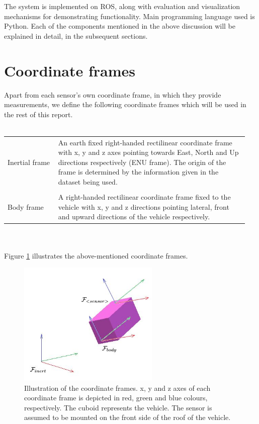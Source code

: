 The system is implemented on \gls{ROS}, along with evaluation and visualization mechanisms for demonstrating functionality. Main programming language used is Python. Each of the components mentioned in the above discussion will be explained in detail, in the subsequent sections.







\section{Coordinate frames}
Apart from each sensor's own coordinate frame, in which they provide measurements, we define the following coordinate frames which will be used in the rest of this report.\\\\
\begin{tabular}{p{0.2\linewidth} p{0.75\linewidth} } 
	Inertial frame & An earth fixed right-handed rectilinear coordinate frame with x, y and z axes pointing towards East, North and Up directions respectively (ENU frame). The origin of the frame is determined by the information given in the dataset being used.\\\\
	Body frame & A right-handed rectilinear coordinate frame fixed to the vehicle with x, y and z directions pointing lateral, front and upward directions of the vehicle respectively.
\end{tabular}\\\\
Figure \ref{fig:pa:coordinateFrames} illustrates the above-mentioned coordinate frames.
\begin{figure}[h]
	\begin{center}
	\includegraphics[width=0.6\textwidth]{figs/coordinate-frames.jpg}
	\end{center}
	\vspace{-0.5cm}
	\caption[Coordinate frames]{Illustration of the coordinate frames. x, y and z axes of each coordinate frame is depicted in red, green and blue colours, respectively. The cuboid represents the vehicle. The sensor is assumed to be mounted on the front side of the roof of the vehicle.}
	\label{fig:pa:coordinateFrames}
	\vspace{0.5cm}
\end{figure}






